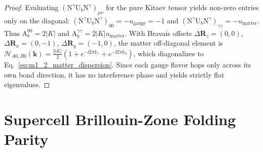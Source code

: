 \begin{proof}
Evaluating $(\mathrm{N}^\gamma \mathrm{U}_b \mathrm{N}^\gamma)_{\mu\nu}$ for the pure Kitaev tensor yields non-zero entries only on the diagonal: $(\mathrm{N}^\gamma \mathrm{U}_b \mathrm{N}^\gamma)_{00} = -u_{\mathrm{gauge}} = -1$ and $(\mathrm{N}^\gamma \mathrm{U}_b \mathrm{N}^\gamma)_{\gamma\gamma} = -u_{\mathrm{matter}}$. Thus $\mathrm{A}_b^{00} = 2|K|$ and $\mathrm{A}_b^{\gamma\gamma} = 2|K|u_{\mathrm{matter}}$. With Bravais offsets $\Delta\mathbf{R}_z = (0,0)$, $\Delta\mathbf{R}_x = (0,-1)$, $\Delta\mathbf{R}_y = (-1,0)$, the matter off-diagonal element is $\mathcal{H}_{A0, B0}(\mathbf{k}) = \frac{\ii|K|}{2}(1 + e^{-\ii 2\pi k_1} + e^{-\ii 2\pi k_2})$, which diagonalizes to Eq.~\eqref{eq:m1_2_matter_dispersion}. Since each gauge flavor hops only across its own bond direction, it has no interference phase and yields strictly flat eigenvalues.
\end{proof}




\section{Supercell Brillouin-Zone Folding Parity}
\label{sec:m1_2_folding_parity}

